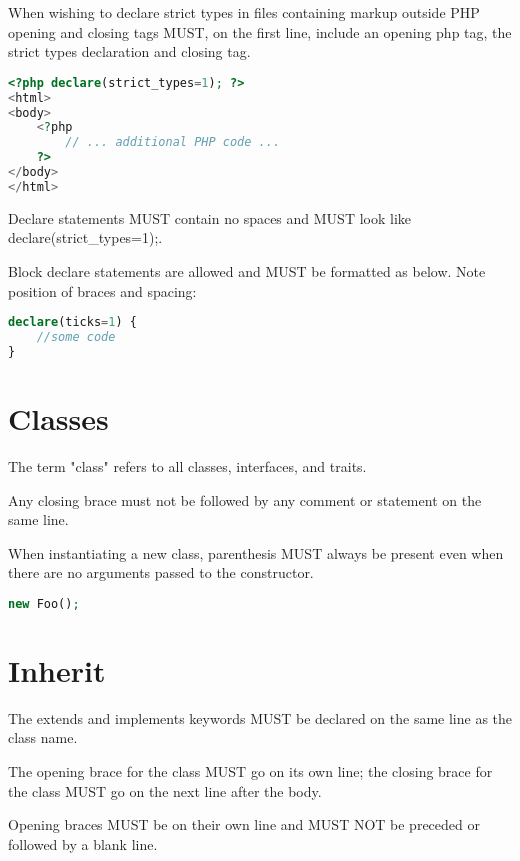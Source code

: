When wishing to declare strict types in files containing markup outside PHP opening and closing tags MUST, on the first line, include an opening php tag, the strict types declaration and closing tag.



\begin{lstlisting}[language=PHP]
<?php declare(strict_types=1); ?>
<html>
<body>
    <?php
        // ... additional PHP code ...
    ?>
</body>
</html>
\end{lstlisting}


Declare statements MUST contain no spaces and MUST look like declare(strict\_types=1);.

Block declare statements are allowed and MUST be formatted as below. Note position of braces and spacing:





\begin{lstlisting}[language=PHP]
declare(ticks=1) {
    //some code
}
\end{lstlisting}


\section{Classes}

The term "class" refers to all classes, interfaces, and traits.

Any closing brace must not be followed by any comment or statement on the same line.

When instantiating a new class, parenthesis MUST always be present even when there are no arguments passed to the constructor.


\begin{lstlisting}[language=PHP]
new Foo();
\end{lstlisting}


\section{Inherit}


The extends and implements keywords MUST be declared on the same line as the class name.

The opening brace for the class MUST go on its own line; the closing brace for the class MUST go on the next line after the body.

Opening braces MUST be on their own line and MUST NOT be preceded or followed by a blank line.

